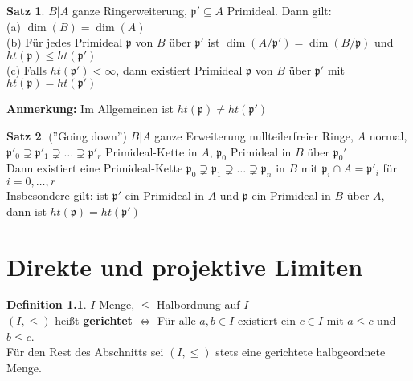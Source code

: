 \documentclass[10pt,a4paper,numbers=endperiod]{scrreprt}
\theoremstyle{definition}
\newtheorem{satz}{Satz}[section]
\newtheorem{defi}[satz]{Definition}
\begin{document}
\begin{satz}
	$B|A$ ganze Ringerweiterung, $\mathfrak{p}' \subseteq A$ Primideal. Dann gilt:\\
	(a) $\dim(B) = \dim(A)$\\
	(b) Für jedes Primideal $\mathfrak{p}$ von $B$ über $\mathfrak{p}'$ ist $\dim(A/\mathfrak{p}') = \dim(B/\mathfrak{p})$ und $ht(\mathfrak{p}) \leq ht(\mathfrak{p}')$\\
	(c) Falls $ht(\mathfrak{p}') < \infty$, dann existiert Primideal $\mathfrak{p}$ von $B$ über $\mathfrak{p}'$ mit $ht(\mathfrak{p}) = ht(\mathfrak{p}')$
\end{satz}

\textbf{Anmerkung:} Im Allgemeinen ist $ht(\mathfrak{p}) \neq ht(\mathfrak{p}')$

\begin{satz}
	(''Going down'') $B|A$ ganze Erweiterung nullteilerfreier Ringe, $A$ normal, $\mathfrak{p}'_0 \supsetneq \mathfrak{p}'_1 \supsetneq \ldots \supsetneq \mathfrak{p}'_r$ Primideal-Kette in $A$, $\mathfrak{p}_0$ Primideal in $B$ über $\mathfrak{p}_0'$\\
	Dann existiert eine Primideal-Kette $\mathfrak{p}_0 \supsetneq \mathfrak{p}_1 \supsetneq \ldots \supsetneq \mathfrak{p}_n$ in $B$ mit $\mathfrak{p}_i \cap A = \mathfrak{p}'_i$ für $i = 0, \ldots, r$\\
	Insbesondere gilt: ist $\mathfrak{p}'$ ein Primideal in $A$ und $\mathfrak{p}$ ein Primideal in $B$ über $A$, dann ist $ht(\mathfrak{p}) = ht(\mathfrak{p}')$
\end{satz}

\chapter{Direkte und projektive Limiten} 

\begin{defi}
	$I$ Menge, $\leq$ Halbordnung auf $I$\\
	$(I, \leq)$ heißt \textbf{gerichtet} $\Leftrightarrow$ Für alle $a, b \in I$ existiert ein $c \in I$ mit $a \leq c$ und $b \leq c$.\\
	Für den Rest des Abschnitts sei $(I, \leq)$ stets eine gerichtete halbgeordnete Menge.
\end{defi}
\end{document}
